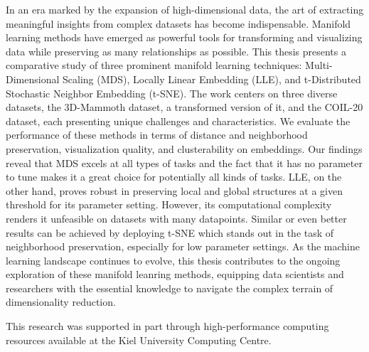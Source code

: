 In an era marked by the expansion of high-dimensional data, the art of extracting meaningful insights from complex datasets has become indispensable. Manifold learning methods have emerged as powerful tools for transforming and visualizing data while preserving as many relationships as possible. This thesis presents a comparative study of three prominent manifold learning techniques: Multi-Dimensional Scaling (MDS), Locally Linear Embedding (LLE), and t-Distributed Stochastic Neighbor Embedding (t-SNE). The work centers on three diverse datasets, the 3D-Mammoth dataset, a transformed version of it, and the COIL-20 dataset, each presenting unique challenges and characteristics. We evaluate the performance of these methods in terms of distance and neighborhood preservation, visualization quality, and clusterability on embeddings. Our findings reveal that MDS excels at all types of tasks and the fact that it has no parameter to tune makes it a great choice for potentially all kinds of tasks. LLE, on the other hand, proves robust in preserving local and global structures at a given threshold for its parameter setting. However, its computational complexity renders it unfeasible on datasets with many datapoints. Similar or even better results can be achieved by deploying t-SNE which stands out in the task of neighborhood preservation, especially for low parameter settings. As the machine learning landscape continues to evolve, this thesis contributes to the ongoing exploration of these manifold leanring methods, equipping data scientists and researchers with the essential knowledge to navigate the complex terrain of dimensionality reduction.

\vspace*{\fill}
This research was supported in part through high-performance computing resources available at the Kiel University Computing Centre.